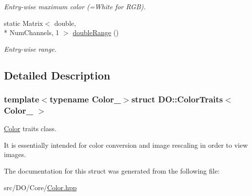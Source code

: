 \begin{DoxyCompactItemize}
\begin{DoxyCompactList}\small\item\em Entry-\/wise maximum color (=White for R\-G\-B). \end{DoxyCompactList}\item 
\hypertarget{struct_d_o_1_1_color_traits_abbd492ef4826701b8b1a1e523cdc2a69}{static Matrix$<$ double, \\*
Num\-Channels, 1 $>$ \hyperlink{struct_d_o_1_1_color_traits_abbd492ef4826701b8b1a1e523cdc2a69}{double\-Range} ()}\label{struct_d_o_1_1_color_traits_abbd492ef4826701b8b1a1e523cdc2a69}

\begin{DoxyCompactList}\small\item\em Entry-\/wise range. \end{DoxyCompactList}\end{DoxyCompactItemize}


\subsection{Detailed Description}
\subsubsection*{template$<$typename Color\-\_\-$>$struct D\-O\-::\-Color\-Traits$<$ Color\-\_\- $>$}

\hyperlink{class_d_o_1_1_color}{Color} traits class. 

It is essentially intended for color conversion and image rescaling in order to view images. 

The documentation for this struct was generated from the following file\-:\begin{DoxyCompactItemize}
\item 
src/\-D\-O/\-Core/\hyperlink{_color_8hpp}{Color.\-hpp}\end{DoxyCompactItemize}
